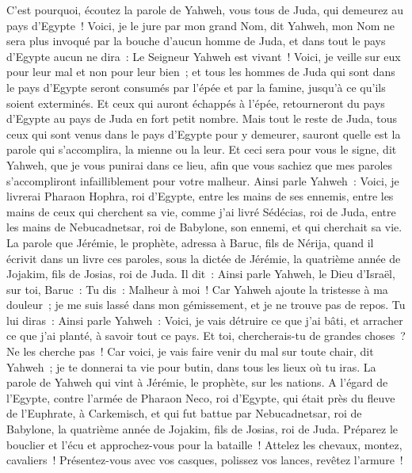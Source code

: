 \begin{multicols}{2}
C'est pourquoi, écoutez la parole de Yahweh, vous tous de Juda, qui demeurez au pays d'Egypte~! Voici, je le jure par mon grand Nom, dit Yahweh, mon Nom ne sera plus invoqué par la bouche d'aucun homme de Juda, et dans tout le pays d'Egypte aucun ne dira~: Le Seigneur Yahweh est vivant~!
Voici, je veille sur eux pour leur mal et non pour leur bien~; et tous les hommes de Juda qui sont dans le pays d'Egypte seront consumés par l'épée et par la famine, jusqu'à ce qu'ils soient exterminés.
Et ceux qui auront échappés à l'épée, retourneront du pays d'Egypte au pays de Juda en fort petit nombre. Mais tout le reste de Juda, tous ceux qui sont venus dans le pays d'Egypte pour y demeurer, sauront quelle est la parole qui s'accomplira, la mienne ou la leur.
Et ceci sera pour vous le signe, dit Yahweh, que je vous punirai dans ce lieu, afin que vous sachiez que mes paroles s'accompliront infailliblement pour votre malheur.
Ainsi parle Yahweh~: Voici, je livrerai Pharaon Hophra, roi d'Egypte, entre les mains de ses ennemis, entre les mains de ceux qui cherchent sa vie, comme j'ai livré Sédécias, roi de Juda, entre les mains de Nebucadnetsar, roi de Babylone, son ennemi, et qui cherchait sa vie.
\VerseOne{}La parole que Jérémie, le prophète, adressa à Baruc, fils de Nérija, quand il écrivit dans un livre ces paroles, sous la dictée de Jérémie, la quatrième année de Jojakim, fils de Josias, roi de Juda. Il dit~:
Ainsi parle Yahweh, le Dieu d'Israël, sur toi, Baruc~:
Tu dis~: Malheur à moi~! Car Yahweh ajoute la tristesse à ma douleur~; je me suis lassé dans mon gémissement, et je ne trouve pas de repos.
Tu lui diras~: Ainsi parle Yahweh~: Voici, je vais détruire ce que j'ai bâti, et arracher ce que j'ai planté, à savoir tout ce pays.
Et toi, chercherais-tu de grandes choses~? Ne les cherche pas~! Car voici, je vais faire venir du mal sur toute chair, dit Yahweh~; je te donnerai ta vie pour butin, dans tous les lieux où tu iras.
\VerseOne{}La parole de Yahweh qui vint à Jérémie, le prophète, sur les nations.
A l'égard de l'Egypte, contre l'armée de Pharaon Neco, roi d'Egypte, qui était près du fleuve de l'Euphrate, à Carkemisch, et qui fut battue par Nebucadnetsar, roi de Babylone, la quatrième année de Jojakim, fils de Josias, roi de Juda.
Préparez le bouclier et l'écu et approchez-vous pour la bataille~!
Attelez les chevaux, montez, cavaliers~! Présentez-vous avec vos casques, polissez vos lances, revêtez l'armure~!

\end{multicols}
